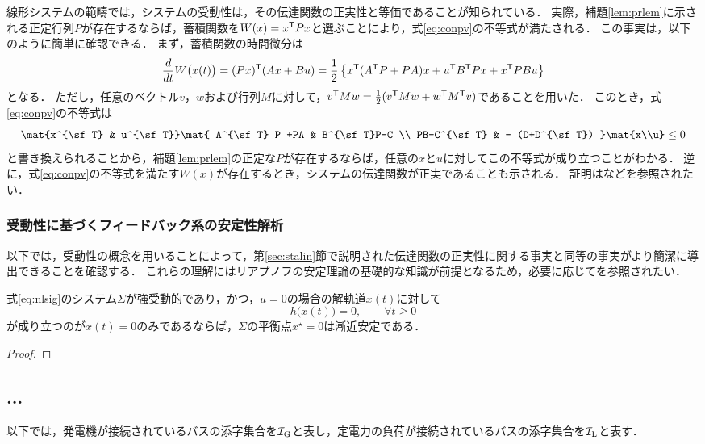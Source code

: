 \documentclass[a4j,10pt,oneside,openany,dvipdfmx]{jsbook}
\begin{document}
線形システムの範疇では，システムの受動性は，その伝達関数の正実性と等価であることが知られている．
実際，補題\ref{lem:prlem}に示される正定行列$P$が存在するならば，蓄積関数を$W(x)=x^{\sf T}Px$と選ぶことにより，式\eqref{eq:conpv}の不等式が満たされる．
この事実は，以下のように簡単に確認できる．
まず，蓄積関数の時間微分は
\[
\frac{d}{dt} W\bigl( x(t) \bigr)
=(Px)^{\sf T}(Ax+Bu) = 
\frac{1}{2}
\left\{
x^{\sf T} (A^{\sf T} P +PA)x 
+ u^{\sf T} B^{\sf T}Px+ x^{\sf T} PBu
\right\}
\]
となる．
ただし，任意のベクトル$v$，$w$および行列$M$に対して，$v^{\sf T}Mw = \frac{1}{2} (v^{\sf T}Mw + w^{\sf T}M^{\sf T}v)$であることを用いた．
このとき，式\eqref{eq:conpv}の不等式は
\[
\mat{x^{\sf T} & u^{\sf T}}
\mat{
A^{\sf T} P +PA & B^{\sf T}P-C \\
PB-C^{\sf T} & - (D+D^{\sf T})
}
\mat{x\\u}
\leq 0
\]
と書き換えられることから，補題\ref{lem:prlem}の正定な$P$が存在するならば，任意の$x$と$u$に対してこの不等式が成り立つことがわかる．
逆に，式\eqref{eq:conpv}の不等式を満たす$W(x)$が存在するとき，システムの伝達関数が正実であることも示される．
証明は\cite[第5.9.1節]{antoulas2005approximation}などを参照されたい．


\subsubsection{受動性に基づくフィードバック系の安定性解析}

以下では，受動性の概念を用いることによって，第\ref{sec:stalin}節で説明された伝達関数の正実性に関する事実と同等の事実がより簡潔に導出できることを確認する．
これらの理解にはリアプノフの安定理論の基礎的な知識が前提となるため，必要に応じてを参照されたい．

\begin{lemma}\label{lem:pssta}
式\eqref{eq:nlsig}のシステム$\Sigma$が強受動的であり，かつ，$u=0$の場合の解軌道$x(t)$に対して
\begin{equation}
h\bigl(
x(t)
\bigr)=0,\qquad
\forall t\geq 0
\end{equation}
が成り立つのが$x(t)=0$のみであるならば，$\Sigma$の平衡点$x^{\star}=0$は漸近安定である．
\end{lemma}

\begin{proof}
\proofend
\end{proof}




\subsection{...}

以下では，発電機が接続されているバスの添字集合を$\mathcal{I}_{\rm G}$と表し，定電力の負荷が接続されているバスの添字集合を$\mathcal{I}_{\rm L}$と表す．






\newpage
%
%
\end{document}
